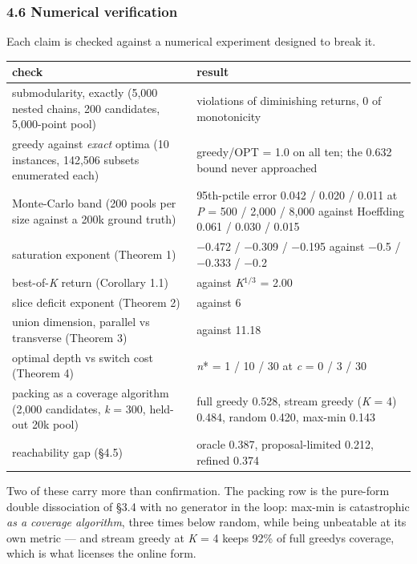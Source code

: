 \documentclass[
  10pt,
]{article}
\theoremstyle{plain}
\theoremstyle{definition}
\begin{document}
\subsubsection{4.6 Numerical
verification}\label{46-numerical-verification}

Each claim is checked against a numerical experiment designed to break
it.

{\footnotesize
\begin{longtable}[]{@{}>{\raggedright\arraybackslash}p{}>{\raggedright\arraybackslash}p{}@{}}
\toprule\noalign{}
check & result \\
\midrule\noalign{}
\endhead
\bottomrule\noalign{}
\endlastfoot
submodularity, exactly (5,000 nested chains, 200 candidates, 5,000-point
pool) & 0 violations of diminishing returns, 0 of monotonicity \\
greedy against \emph{exact} optima (10 instances, 142,506 subsets
enumerated each) & greedy/OPT = 1.0 on all ten; the 0.632 bound never
approached \\
Monte-Carlo band (200 pools per size against a 200k ground truth) &
95th-pctile error 0.042 / 0.020 / 0.011 at \emph{P} = 500 / 2,000 /
8,000 against Hoeffding 0.061 / 0.030 / 0.015 \\
saturation exponent (Theorem 1) & −0.472 / −0.309 / −0.195 against −0.5
/ −0.333 / −0.2 \\
best-of-\emph{K} return (Corollary 1.1) & 2.19 against
\emph{K}\(^{1/3}\) = 2.00 \\
slice deficit exponent (Theorem 2) & 5.06 against 6 \\
union dimension, parallel vs transverse (Theorem 3) & 1.88 against
11.18 \\
optimal depth vs switch cost (Theorem 4) & \emph{n}* = 1 / 10 / 30 at
\emph{c} = 0 / 3 / 30 \\
packing as a coverage algorithm (2,000 candidates, \emph{k} = 300,
held-out 20k pool) & full greedy 0.528, stream greedy (\emph{K} = 4)
0.484, random 0.420, max-min 0.143 \\
reachability gap (§4.5) & oracle 0.387, proposal-limited 0.212, refined
0.374 \\
\end{longtable}}

Two of these carry more than confirmation. The packing row is the
pure-form double dissociation of §3.4 with no generator in the loop:
max-min is catastrophic \emph{as a coverage algorithm}, three times
below random, while being unbeatable at its own metric --- and stream
greedy at \emph{K} = 4 keeps 92\% of full greedy\textquotesingle s
coverage, which is what licenses the online form.
\end{document}
